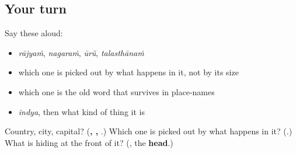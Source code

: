 \subsection*{Your turn}
Say these aloud:

\begin{itemize}
\raggedright
  \item \emph{rājyaṁ}, \emph{nagaraṁ}, \emph{ūrŭ}, \emph{talasthānaṁ}
  \item which one is picked out by what happens in it, not by its size
  \item which one is the old word that survives in place-names
  \item \emph{indya}, then what kind of thing it is
\end{itemize}

\begin{tcolorbox}[breakable,colback=teal!4,colframe=teal!35!black,title={Before you move on}]
Country, city, capital? (\textbf{, , }.) Which one is picked out by what happens in it? (\textbf{}.) What is hiding at the front of it? (\textbf{}, the \textbf{head}.)
\end{tcolorbox}
